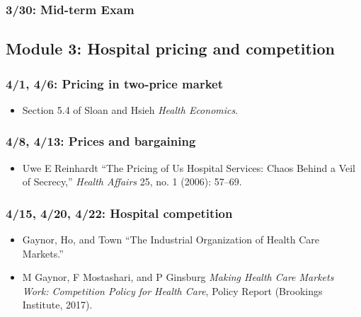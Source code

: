 \documentclass[11pt,]{article}
\providecommand{\tightlist}{%
  \setlength{\itemsep}{0pt}\setlength{\parskip}{0pt}}
\begin{document}
\hypertarget{mid-term-exam}{%
\subsubsection{3/30: Mid-term Exam}\label{mid-term-exam}}

\hypertarget{module-3-hospital-pricing-and-competition}{%
\subsection{Module 3: Hospital pricing and
competition}\label{module-3-hospital-pricing-and-competition}}

\hypertarget{pricing-in-two-price-market}{%
\subsubsection{4/1, 4/6: Pricing in two-price
market}\label{pricing-in-two-price-market}}

\begin{itemize}
\tightlist
\item
  Section 5.4 of Sloan and Hsieh \emph{Health Economics}.
\end{itemize}

\hypertarget{prices-and-bargaining}{%
\subsubsection{4/8, 4/13: Prices and
bargaining}\label{prices-and-bargaining}}

\begin{itemize}
\tightlist
\item
  Uwe E Reinhardt ``The Pricing of Us Hospital Services: Chaos Behind a
  Veil of Secrecy,'' \emph{Health Affairs} 25, no. 1 (2006): 57--69.
\end{itemize}

\hypertarget{hospital-competition}{%
\subsubsection{4/15, 4/20, 4/22: Hospital
competition}\label{hospital-competition}}

\begin{itemize}
\tightlist
\item
  Gaynor, Ho, and Town ``The Industrial Organization of Health Care
  Markets.''
\item
  M Gaynor, F Mostashari, and P Ginsburg \emph{Making Health Care
  Markets Work: Competition Policy for Health Care}, Policy Report
  (Brookings Institute, 2017).
\end{itemize}
\end{document}
